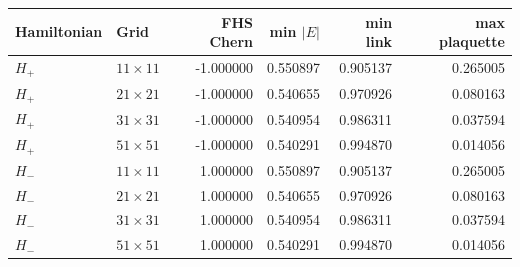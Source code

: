 \begin{tabular}{llrrrr}\toprule
Hamiltonian & Grid & FHS Chern & min $|E|$ & min link & max plaquette \\
\midrule
$H_+$ & $11\times11$ & -1.000000 & 0.550897 & 0.905137 & 0.265005 \\
$H_+$ & $21\times21$ & -1.000000 & 0.540655 & 0.970926 & 0.080163 \\
$H_+$ & $31\times31$ & -1.000000 & 0.540954 & 0.986311 & 0.037594 \\
$H_+$ & $51\times51$ & -1.000000 & 0.540291 & 0.994870 & 0.014056 \\
$H_-$ & $11\times11$ & 1.000000 & 0.550897 & 0.905137 & 0.265005 \\
$H_-$ & $21\times21$ & 1.000000 & 0.540655 & 0.970926 & 0.080163 \\
$H_-$ & $31\times31$ & 1.000000 & 0.540954 & 0.986311 & 0.037594 \\
$H_-$ & $51\times51$ & 1.000000 & 0.540291 & 0.994870 & 0.014056 \\
\bottomrule
\end{tabular}
